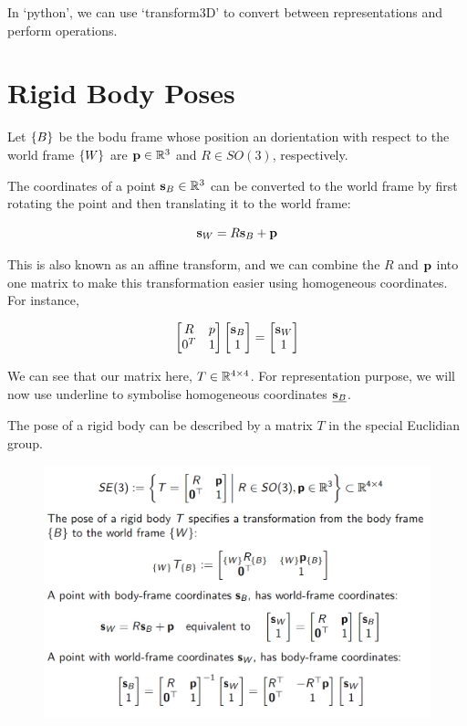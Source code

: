 In `python', we can use `transform3D' to convert between representations and perform operations.

\section{Rigid Body Poses}

Let $\{B\}$ be the bodu frame whose position an dorientation with respect to the world frame $\{W\}$ are $\textbf{p}\in\mathbb{R}^3$ and $R\in SO(3)$, respectively.

The coordinates of a point $\textbf{s}_B\in\mathbb{R}^3$ can be converted to the world frame by first rotating the point and then translating it to the world frame:

\begin{equation*}
    \textbf{s}_W = R\textbf{s}_B + \textbf{p}
\end{equation*}

This is also known as an affine transform, and we can combine the $R$ and $\textbf{p}$ into one matrix to make this transformation easier using homogeneous coordinates. For instance,


\begin{equation*}
    \begin{bmatrix} R & p \\ 0^T & 1\end{bmatrix} \begin{bmatrix} \textbf{s}_B \\ 1 \end{bmatrix} = \begin{bmatrix} \textbf{s}_W \\ 1 \end{bmatrix} 
\end{equation*}

We can see that our matrix here, $T\in\mathbb{R}^{4\times4}$. For representation purpose, we will now use underline to symbolise homogeneous coordinates $\underline{\textbf{s}_B}$.

The pose of a rigid body can be described by a matrix $T$ in the special Euclidian group.

\begin{figure}[h]\centering\includegraphics[width=12cm]{img/j_3_24.png}\end{figure}

